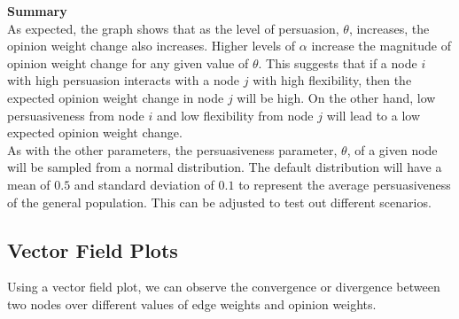 \documentclass[11pt]{article}
\begin{document}
    \begin{center}
    \end{center}
    
    \textbf{Summary}\\

As expected, the graph shows that as the level of persuasion,
\(\theta\), increases, the opinion weight change also increases. Higher
levels of \(\alpha\) increase the magnitude of opinion weight change for
any given value of \(\theta\). This suggests that if a node \(i\) with
high persuasion interacts with a node \(j\) with high flexibility, then
the expected opinion weight change in node \(j\) will be high. On the
other hand, low persuasiveness from node \(i\) and low flexibility from
node \(j\) will lead to a low expected opinion weight change.\\

As with the other parameters, the persuasiveness parameter, \(\theta\),
of a given node will be sampled from a normal distribution. The default
distribution will have a mean of \(0.5\) and standard deviation of
\(0.1\) to represent the average persuasiveness of the general
population. This can be adjusted to test out different scenarios.
\newpage
    \subsection{Vector Field Plots}

Using a vector field plot, we can observe the convergence or divergence
between two nodes over different values of edge weights and opinion
weights.
\end{document}
